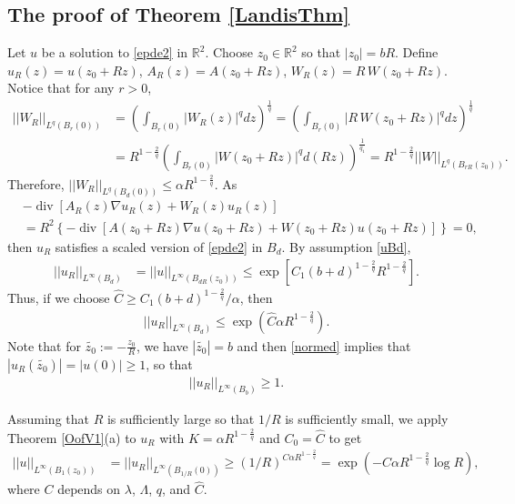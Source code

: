 \documentclass[12pt,reqno]{amsart}
\theoremstyle{plain}
\theoremstyle{definition}
\newcommand{\disp}{\displaystyle}
\DeclareMathOperator{\di}{div}
\newcommand{\al}{\alpha}
\newcommand{\la}{\lambda}
\newcommand{\La}{\Lambda}
\newcommand{\iny}{\infty}
\newcommand{\gr}{\nabla}
\newcommand{\norm}[1]{\left\vert \left\vert #1\right\vert\right\vert}
\newcommand{\abs}[1]{\left\vert#1\right\vert}
\newcommand{\set}[1]{\left\{#1\right\}}
\newcommand{\brac}[1]{\left[#1\right]}
\newcommand{\pr}[1]{\left( #1 \right) }
\newcommand{\R}{\ensuremath{\mathbb{R}}}
\begin{document}
\subsection{The proof of Theorem \ref{LandisThm}}
Let $u$ be a solution to \eqref{epde2} in $\R^2$.
Choose $z_0 \in \R^2$ so that $\abs{z_0} = b R$.
Define $u_R(z) = u(z_0 + Rz)$, $A_R\pr{z} = A\pr{z_0 + R z}$, $W_{R}\pr{z} = R \, W\pr{z_0 + R z}$.
Notice that for any $r > 0$,
\begin{align*}
\norm{W_{R}}_{L^{q}\pr{B_r\pr{0}}}
&= \pr{\int_{B_r\pr{0}} \abs{W_{R}\pr{z}}^{q} dz}^{\frac 1 {q}}
= \pr{\int_{B_r\pr{0}} \abs{R \, W\pr{z_0 + R z}}^{q} dz}^{\frac 1 {q}} \\
&= R^{1 - \frac 2 {q} } \pr{  \int_{B_r\pr{0}} \abs{W\pr{z_0 + R z}}^{q} d\pr{Rz} }^{\frac 1 {q_1}}
= R^{1 - \frac 2 {q} } \norm{W}_{L^{q}\pr{B_{r R}\pr{z_0}}}.
\end{align*}
Therefore, $\disp \norm{W_{R}}_{L^{q}\pr{B_d\pr{0}}}  \le \al R^{1 - \frac 2 {q}}$.
As
\begin{align*}
& - \di\brac{ A_R\pr{z} \gr u_R\pr{z} + W_{R}\pr{z} u_R\pr{z}}  \\
&= R^2 \set{- \di\brac{ A\pr{z_0 + Rz} \gr u\pr{z_0 + Rz} + W\pr{z_0 + Rz} u\pr{z_0 + Rz}}} 
= 0,
\end{align*}
then $u_R$ satisfies a scaled version of \eqref{epde2} in $B_{d}$.
By assumption \eqref{uBd},
\begin{align*}
\norm{u_R}_{L^\iny\pr{B_{d}}}
&= \norm{u}_{L^\iny\pr{B_{dR}\pr{z_0}}} 
\le \exp\brac{C_1 \pr{b + d}^{1 - \frac 2 {q}} R^{1 - \frac 2 {q}}}.
\end{align*}
Thus, if we choose $\hat C \ge C_1 \pr{b + d}^{1 - \frac 2 {q}}/\al$, then
\begin{align}
\norm{u_R}_{L^\iny\pr{B_{d}}}
\le \exp\pr{\hat C \al R^{1 - \frac{2}{q}} }.
\label{uRUpperBd}
\end{align}
Note that for $\disp\widetilde{z_0} := - \frac {z_0}{R} $, we have $\disp\abs{\widetilde{z_0}} = b$ and then \eqref{normed} implies that $\abs{u_R(\widetilde{z_0})} = \abs{u(0)} \ge 1$, so that 
\begin{align}
\norm{u_R}_{L^\iny(B_b)} \ge 1.
\label{uRLowerBd}
\end{align}

Assuming that $R$ is sufficiently large so that $1/R$ is sufficiently small, we apply Theorem \ref{OofV1}(a) to $u_R$ with $K = \al R^{1 - \frac {2}{q}}$ and $C_0 = \hat C$ to get
\begin{align*}
\norm{u}_{L^\iny\pr{{B_{1}(z_0)}}} 
&= \norm{u_R}_{L^\iny\pr{B_{1/R}(0)}}  
\ge (1/R)^{ C {\al R^{1 - \frac {2}{q}}}}
=  \exp\pr{- C {\al R^{1 - \frac {2}{q}}} \log R },
\end{align*}
where $C$ depends on $\la$, $\La$, $q$, and $\hat C$.
\end{document}

